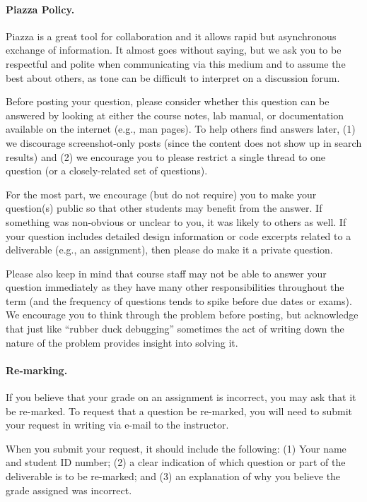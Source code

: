 \paragraph{Piazza Policy.}
Piazza is a great tool for collaboration and it allows rapid but asynchronous exchange of information. It almost goes without saying, but we ask you to be respectful and polite when communicating via this medium and to assume the best about others, as tone can be difficult to interpret on a discussion forum. 

Before posting your question, please consider whether this question can be answered by looking at either the course notes, lab manual, or documentation available on the internet (e.g., man pages). To help others find answers later, (1) we discourage screenshot-only posts (since the content does not show up in search results) and (2) we encourage you to please restrict a single thread to one question (or a closely-related set of questions).

For the most part, we encourage (but do not require) you to make your question(s) public so that other students may benefit from the answer. If something was non-obvious or unclear to you, it was likely to others as well. If your question includes detailed design information or code excerpts related to a deliverable (e.g., an assignment), then please do make it a private question.

Please also keep in mind that course staff may not be able to answer your question immediately as they have many other responsibilities throughout the term (and the frequency of questions tends to spike before due dates or exams). We encourage you to think through the problem before posting, but acknowledge that just like ``rubber duck debugging'' sometimes the act of writing down the nature of the problem provides insight into solving it.

\paragraph{Re-marking.}
If you believe that your grade on an assignment is incorrect, you may ask that it be re-marked. To request that a question be re-marked, you will need to submit your request in writing via e-mail to the instructor.

When you submit your request, it should include the following: (1) Your name and student ID number; (2) a clear indication of which question or part of the deliverable is to be re-marked; and (3) an explanation of why you believe the grade assigned was incorrect.

